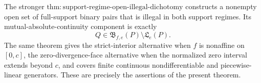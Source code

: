 The stronger \(\mathrm{thm:support\text{-}regime\text{-}open\text{-}illegal\text{-}dichotomy}\) constructs a nonempty open set of full-support binary pairs that is illegal in both support regimes.  Its mutual-absolute-continuity component is exactly
\[
 Q\in\mathfrak B_{f,e}(P)\setminus\mathfrak L_e(P).
\]
The same theorem gives the strict-interior alternative when \(f\) is nonaffine on \([0,c]\), the zero-divergence-face alternative when the normalized zero interval extends beyond \(c\), and covers finite continuous nondifferentiable and piecewise-linear generators.  These are precisely the assertions of the present theorem.